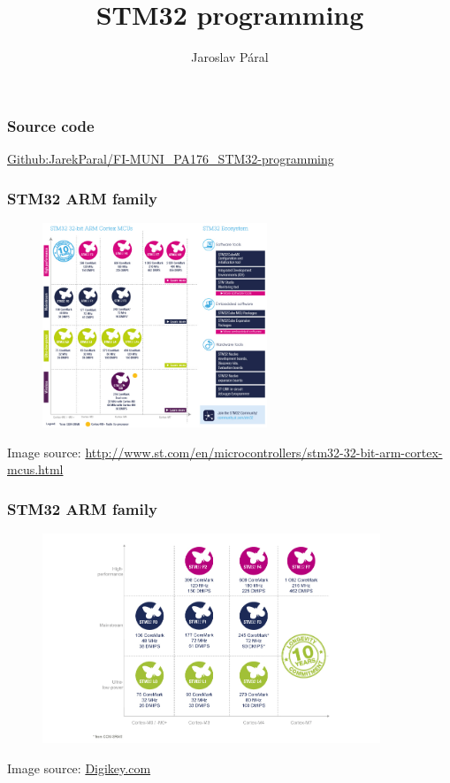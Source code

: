 \documentclass[12;pt,t]{beamer} %
\author{Jaroslav Páral}
\institute[paral.jarek@gmail.com]{FI MUNI: PA176\\[0.5cm]}
\title{STM32 programming}
\newcommand{\srctext}[1]{{\fontsize{7}{9}\selectfont\textcolor{sourcesclr}{#1}}}
\begin{document}
\frame{\titlepage}

\begin{frame}
\frametitle{Source code}
	\vfill
	\begin{center}
		 \href{https://github.com/JarekParal/FI-MUNI_PA176_STM32-programming}{Github:JarekParal/FI-MUNI\_PA176\_STM32-programming}
	\end{center}
	
\end{frame}


\begin{frame}
\frametitle{STM32 ARM family}
	\begin{figure}[H]
		\includegraphics[width=0.6\textwidth]{img/stm32_cl1734.jpg}
	\end{figure}
	\srctext{Image source: \url{http://www.st.com/en/microcontrollers/stm32-32-bit-arm-cortex-mcus.html}}
\end{frame}

\begin{frame}
\frametitle{STM32 ARM family}
	\begin{figure}[H]
		\includegraphics[width=0.9\textwidth]{img/digikey_stm32-cortex.jpg}
	\end{figure}
	\srctext{Image source: \href{https://www.digikey.com/en/product-highlight/s/stmicroelectronics/stm32-overview}{Digikey.com}}
\end{frame}
\end{document}
